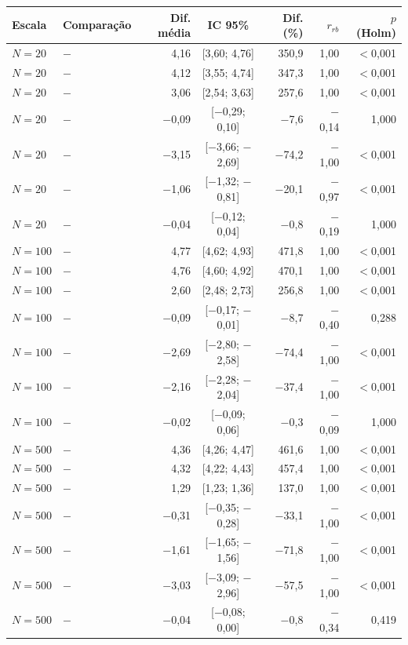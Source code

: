 \begin{tabular}{@{}llrcrrr@{}}
\toprule
Escala & Comparação & Dif. média & IC 95\% & Dif. (\%) & $r_{rb}$ & $p$ (Holm) \\
\midrule
$N=20$ & \polB{} $-$ \polA{} & 4,16 & [3,60; 4,76] & 350,9 & 1,00 & $<$0,001 \\
$N=20$ & \polBOR{} $-$ \polA{} & 4,12 & [3,55; 4,74] & 347,3 & 1,00 & $<$0,001 \\
$N=20$ & \polC{} $-$ \polA{} & 3,06 & [2,54; 3,63] & 257,6 & 1,00 & $<$0,001 \\
$N=20$ & \polD{} $-$ \polA{} & $-$0,09 & [$-$0,29; 0,10] & $-$7,6 & $-$0,14 & 1,000 \\
$N=20$ & \polD{} $-$ \polC{} & $-$3,15 & [$-$3,66; $-$2,69] & $-$74,2 & $-$1,00 & $<$0,001 \\
$N=20$ & \polC{} $-$ \polBOR{} & $-$1,06 & [$-$1,32; $-$0,81] & $-$20,1 & $-$0,97 & $<$0,001 \\
$N=20$ & \polBOR{} $-$ \polB{} & $-$0,04 & [$-$0,12; 0,04] & $-$0,8 & $-$0,19 & 1,000 \\
$N=100$ & \polB{} $-$ \polA{} & 4,77 & [4,62; 4,93] & 471,8 & 1,00 & $<$0,001 \\
$N=100$ & \polBOR{} $-$ \polA{} & 4,76 & [4,60; 4,92] & 470,1 & 1,00 & $<$0,001 \\
$N=100$ & \polC{} $-$ \polA{} & 2,60 & [2,48; 2,73] & 256,8 & 1,00 & $<$0,001 \\
$N=100$ & \polD{} $-$ \polA{} & $-$0,09 & [$-$0,17; $-$0,01] & $-$8,7 & $-$0,40 & 0,288 \\
$N=100$ & \polD{} $-$ \polC{} & $-$2,69 & [$-$2,80; $-$2,58] & $-$74,4 & $-$1,00 & $<$0,001 \\
$N=100$ & \polC{} $-$ \polBOR{} & $-$2,16 & [$-$2,28; $-$2,04] & $-$37,4 & $-$1,00 & $<$0,001 \\
$N=100$ & \polBOR{} $-$ \polB{} & $-$0,02 & [$-$0,09; 0,06] & $-$0,3 & $-$0,09 & 1,000 \\
$N=500$ & \polB{} $-$ \polA{} & 4,36 & [4,26; 4,47] & 461,6 & 1,00 & $<$0,001 \\
$N=500$ & \polBOR{} $-$ \polA{} & 4,32 & [4,22; 4,43] & 457,4 & 1,00 & $<$0,001 \\
$N=500$ & \polC{} $-$ \polA{} & 1,29 & [1,23; 1,36] & 137,0 & 1,00 & $<$0,001 \\
$N=500$ & \polD{} $-$ \polA{} & $-$0,31 & [$-$0,35; $-$0,28] & $-$33,1 & $-$1,00 & $<$0,001 \\
$N=500$ & \polD{} $-$ \polC{} & $-$1,61 & [$-$1,65; $-$1,56] & $-$71,8 & $-$1,00 & $<$0,001 \\
$N=500$ & \polC{} $-$ \polBOR{} & $-$3,03 & [$-$3,09; $-$2,96] & $-$57,5 & $-$1,00 & $<$0,001 \\
$N=500$ & \polBOR{} $-$ \polB{} & $-$0,04 & [$-$0,08; 0,00] & $-$0,8 & $-$0,34 & 0,419 \\
\bottomrule
\end{tabular}
